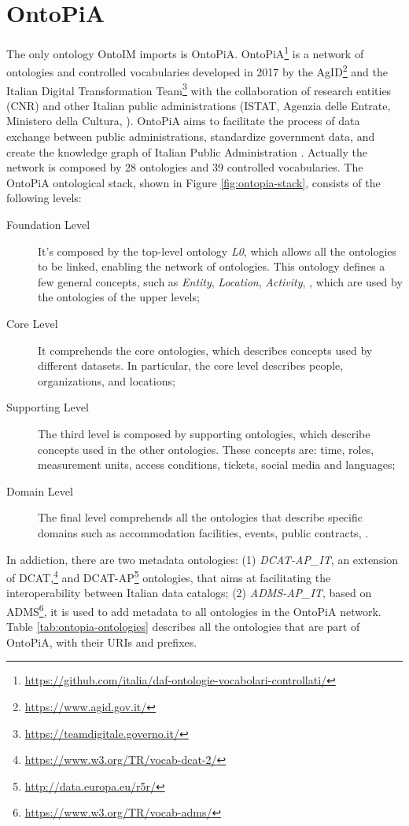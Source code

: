 \section{OntoPiA}
\label{sec:ontopia}

The only ontology OntoIM imports is OntoPiA. OntoPiA\footnote{\url{https://github.com/italia/daf-ontologie-vocabolari-controllati/}} is a network of ontologies and controlled vocabularies developed in 2017 by the \ac{AgID}\footnote{\url{https://www.agid.gov.it/}} and the Italian Digital Transformation Team\footnote{\url{https://teamdigitale.governo.it/}} with the collaboration of research entities (CNR) and other Italian public administrations (ISTAT, Agenzia delle Entrate, Ministero della Cultura, \etc). OntoPiA aims to facilitate the process of data exchange between public administrations, standardize government data, and create the knowledge graph of Italian Public Administration \cite{agid2017pt, agid2017lg}. Actually the network is composed by 28 ontologies and 39 controlled vocabularies. The OntoPiA ontological stack, shown in Figure \ref{fig:ontopia-stack}, consists of the following levels:

\begin{description}
  \item[Foundation Level] It's composed by the top-level ontology \textit{L0}, which allows all the ontologies to be linked, enabling the network of ontologies. This ontology defines a few general concepts, such as \textit{Entity}, \textit{Location}, \textit{Activity}, \etc, which are used by the ontologies of the upper levels;
  \item[Core Level] It comprehends the core ontologies, which describes concepts used by different datasets. In particular, the core level describes people, organizations, and locations;
  \item[Supporting Level] The third level is composed by supporting ontologies, which describe concepts used in the other ontologies. These concepts are: time, roles, measurement units, access conditions, tickets, social media and languages;
  \item[Domain Level] The final level comprehends all the ontologies that describe specific domains such as accommodation facilities, events, public contracts, \etc.
\end{description}

In addiction, there are two metadata ontologies: (1) \textit{DCAT-AP\_IT}, an extension of DCAT,\footnote{\url{https://www.w3.org/TR/vocab-dcat-2/}} and DCAT-AP\footnote{\url{http://data.europa.eu/r5r/}} ontologies, that aims at facilitating the interoperability between Italian data catalogs; (2) \textit{ADMS-AP\_IT}, based on ADMS\footnote{\url{https://www.w3.org/TR/vocab-adms/}}, it is used to add metadata to all ontologies in the OntoPiA network. Table \ref{tab:ontopia-ontologies} describes all the ontologies that are part of OntoPiA, with their \acp{URI} and prefixes.


